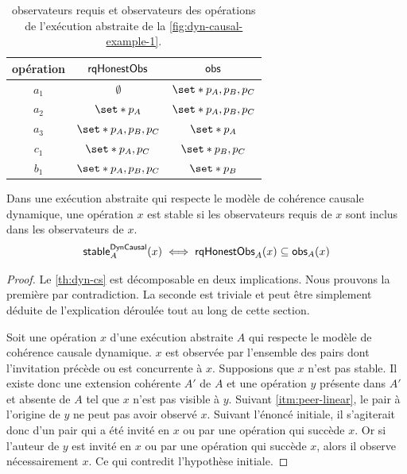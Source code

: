 \begin{table}[htb]
    \centering
    \begin{tabular}{ccc}
        opération & $\operatorname{\mathsf{rqHonestObs}}$ & $\operatorname{\mathsf{obs}}$ \\
        \toprule
        $a_1$ & $\emptyset$ & $\set*{p_A, p_B, p_C}$ \\
        $a_2$ & $\set*{p_A}$ & $\set*{p_A, p_B, p_C}$ \\
        $a_3$ & $\set*{p_A, p_B, p_C}$ & $\set*{p_A}$ \\
        $c_1$ & $\set*{p_A, p_C}$ & $\set*{p_B, p_C}$\\
        $b_1$ & $\set*{p_A, p_B, p_C}$ & $\set*{p_B}$ \\
    \end{tabular}
    \caption[Observateurs requis]{observateurs requis et observateurs des opérations de l'exécution abstraite de la \autoref{fig:dyn-causal-example-1}.}\label{tab:rq-obs}
\end{table}



\begin{theorem}\label{th:dyn-cs}
Dans une exécution abstraite qui respecte le modèle de cohérence causale dynamique, une opération $x$ est stable si les observateurs requis de $x$ sont inclus dans les observateurs de $x$.
\begin{equation*}
    \operatorname{\mathsf{stable}}_A^{\operatorname{\mathsf{DynCausal}}}(x) \iff \operatorname{\mathsf{rqHonestObs}}_A(x) \subseteq \operatorname{\mathsf{obs}}_A(x)
\end{equation*}
\end{theorem}

\begin{proof}
Le \autoref{th:dyn-cs} est décomposable en deux implications.
Nous prouvons la première par contradiction.
La seconde est triviale et peut être simplement déduite de l'explication déroulée tout au long de cette section.

Soit une opération $x$ d'une exécution abstraite $A$ qui respecte le modèle de cohérence causale dynamique.
$x$ est observée par l'ensemble des pairs dont l'invitation précède ou est concurrente à $x$.
Supposions que $x$ n'est pas stable.
Il existe donc une extension cohérente $A'$ de $A$ et une opération $y$ présente dans $A'$ et absente de $A$ tel que $x$ n'est pas visible à $y$.
Suivant \autoref{itm:peer-linear}, le pair à l'origine de $y$ ne peut pas avoir observé $x$.
Suivant l'énoncé initiale, il s'agiterait donc d'un pair qui a été invité en $x$ ou par une opération qui succède $x$.
Or si l'auteur de $y$ est invité en $x$ ou par une opération qui succède $x$, alors il observe nécessairement $x$.
Ce qui contredit l'hypothèse initiale.
\end{proof}



